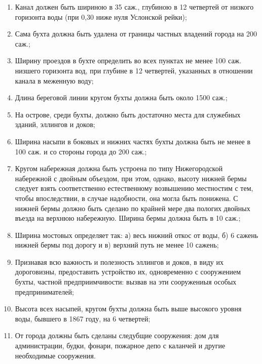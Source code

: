 \documentclass[oneside,final,14pt]{extreport}
\begin{document}
\begin{enumerate} 
	\item Канал должен быть шириною в 35 саж., глубиною в 12 четвертей от низкого горизонта воды (при 0,30 ниже нуля Услонской рейки);
	\item Сама бухта должна быть удалена от границы частных владений города на 200 саж.;
	\item Ширину проездов в бухте определить во всех пунктах не менее 100 саж. низшего горизонта вод, при глубине в 12 четвертей, указанных в отношении канала в меженную воду;
	\item Длина береговой линии кругом бухты должна быть около 1500 саж.;
	\item На острове, среди бухты, должно быть достаточно места для служебных зданий, эллингов и доков;
	\item Ширина насыпи в боковых и нижних частях бухты должна быть не менее в 100 саж. и со стороны города до 200 саж.;
	\item Кругом набережная должна быть устроена по типу Нижегородской набережной с двойным объездом, при этом, однако, высоту нижней бермы следует взять соответственно естественному возвышению местностим с тем, чтобы впоследствии, в случае надобности, она могла быть понижена. С нижней бермы должно быть сделано по крайней мере два пологих двойных въезда на верхнюю набережную. Ширина бермы должна быть в 10 саж.;
	\item  Ширина мостовых определяет так: а) весь нижний откос от воды, б) 6 сажень нижней бермы под дорогу и в) верхний путь не менее 10 сажень;
	\item Признавая всю важность и полезность эллингов и доков, в виду их дороговизны, предоставить устройство их, одновременно с сооружением бухты, частной предприимчивости: вызвав на эти сооружениыя особых предпринимателей;
	\item Высота всех насыпей, кругом бухты должна быть выше высокого уровня воды, бывшего в 1867 году, на 6 четвертей;
	\item От города должны быть сделаны следубщие сооружения: дом для администрации, будки, фонари, пожарное депо с каланчей и другие необходимые сооружения.
\end{enumerate}
\end{document}
